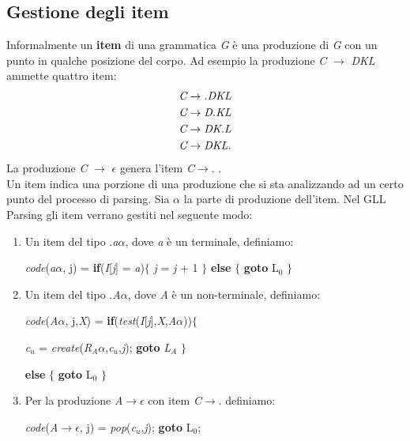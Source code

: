 \subsection{Gestione degli item}
Informalmente un \textbf{item} \cite{libro: compilatori} di una grammatica \textit{G} è una produzione di \textit{G} con un punto in qualche posizione del corpo. Ad esempio la produzione \textit{C} $\to$ \textit{DKL} ammette quattro item:
\begin{align}
	\textit{C} & \to \textit{.DKL} \notag \\
	\textit{C} & \to \textit{D.KL} \notag \\
	\textit{C} & \to \textit{DK.L} \notag \\
	\textit{C} & \to \textit{DKL.} \notag 
\end{align}
La produzione \textit{C} $\to$ $\epsilon$ genera l'item \textit{C}$\to$. .\\
Un item indica una porzione di una produzione che si sta analizzando ad un certo punto del processo di parsing. Sia $\alpha$ la parte di produzione dell'item. Nel GLL Parsing gli item verrano gestiti nel seguente modo: 
\begin{enumerate}
	\item Un item del tipo .\textit{a}$\alpha$, dove \textit{a} è un terminale, definiamo:\par
	\textit{code}(\textit{a}$\alpha$, j) = \textbf{if}(\textit{I}[\textit{j}] = \textit{a})$\{$ \textit{j} = \textit{j} + 1 $\}$ \textbf{else} $\{$ \textbf{goto} L$_0$ $\}$
	\item Un item del tipo .\textit{A}$\alpha$, dove \textit{A} è un non-terminale, definiamo:\par
	\textit{code}(\textit{A}$\alpha$, j,\textit{X}) = \textbf{if}(\textit{test}(\textit{I}[\textit{j}],\textit{X},\textit{A}$\alpha$))$\{$ \par 
	\hspace{4cm}\textit{c}$_u$ = \textit{create}(\textit{R}$_A\alpha$,\textit{c}$_u$,\textit{j}); \textbf{goto} \textit{L}$_A$ $\}$ \par 
	\hspace{3cm}\textbf{else} $\{$ \textbf{goto} L$_0$ $\}$
	\item Per la produzione \textit{A}$\to$$\epsilon$ con item \textit{C}$\to$. definiamo: \par
	\hspace{1cm}\textit{code}(\textit{A}$\to$$\epsilon$, j) = \textit{pop}(\textit{c}$_u$,\textit{j}); \textbf{goto} L$_0$;
\end{enumerate}

